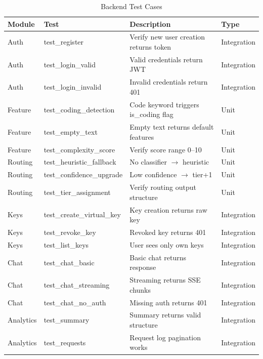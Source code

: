 \documentclass[12pt,a4paper]{report}
\begin{document}
\begin{table}[H]
    \centering
    \caption{Backend Test Cases}
    \label{tab:backend_tests}
    \begin{tabularx}{\textwidth}{l l X l}
    \toprule
    \textbf{Module} & \textbf{Test} & \textbf{Description} & \textbf{Type} \\
    \midrule
    Auth & test\_register & Verify new user creation returns token & Integration \\
    Auth & test\_login\_valid & Valid credentials return JWT & Integration \\
    Auth & test\_login\_invalid & Invalid credentials return 401 & Integration \\
    \rowcolor{gray!10}
    Feature & test\_coding\_detection & Code keyword triggers is\_coding flag & Unit \\
    Feature & test\_empty\_text & Empty text returns default features & Unit \\
    Feature & test\_complexity\_score & Verify score range 0--10 & Unit \\
    \rowcolor{gray!10}
    Routing & test\_heuristic\_fallback & No classifier $\rightarrow$ heuristic & Unit \\
    Routing & test\_confidence\_upgrade & Low confidence $\rightarrow$ tier+1 & Unit \\
    Routing & test\_tier\_assignment & Verify routing output structure & Unit \\
    \rowcolor{gray!10}
    Keys & test\_create\_virtual\_key & Key creation returns raw key & Integration \\
    Keys & test\_revoke\_key & Revoked key returns 401 & Integration \\
    Keys & test\_list\_keys & User sees only own keys & Integration \\
    \rowcolor{gray!10}
    Chat & test\_chat\_basic & Basic chat returns response & Integration \\
    Chat & test\_chat\_streaming & Streaming returns SSE chunks & Integration \\
    Chat & test\_chat\_no\_auth & Missing auth returns 401 & Integration \\
    \rowcolor{gray!10}
    Analytics & test\_summary & Summary returns valid structure & Integration \\
    Analytics & test\_requests & Request log pagination works & Integration \\
    \bottomrule
    \end{tabularx}
\end{table}
\end{document}
